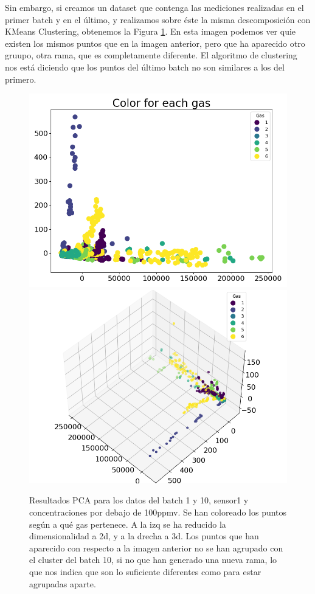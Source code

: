 Sin embargo, si creamos un dataset que contenga las mediciones realizadas en el primer batch y en el último, y realizamos sobre éste la misma descomposición con KMeans Clustering, obtenemos la Figura \ref{fig:step03kmeans-1-10-color-for-each-gas}. En esta imagen podemos ver quie existen los mismos puntos que en la imagen anterior, pero que ha aparecido otro gruupo, otra rama, que es completamente diferente. El algoritmo de clustering nos está diciendo que los puntos del último batch no son similares a los del primero. 

\begin{figure}[h!]
	\centering
	\includegraphics[width=0.45\linewidth]{"../py_imgs/Step0_3_Color for each gas_Batch1and10_Sensor1_Conc less 100ppmv"}
	\includegraphics[width=0.45\linewidth]{"../py_imgs/Step0_3_Color for each gas_3d_Batch1and10_Sensor1_Conc less 100ppmv"}
	\caption[Resultados PCA modelo batch 1 y 10]{Resultados PCA para los datos del batch 1 y 10, sensor1 y concentraciones por debajo de 100ppmv. Se han coloreado los  puntos según a qué gas pertenece. A la izq se ha reducido la dimensionalidad a 2d, y a la drecha a 3d. Los puntos que han aparecido con respecto a la imagen anterior no se han agrupado con el cluster del batch 10, si no que han generado una nueva rama, lo que nos indica que son lo suficiente diferentes como para estar agrupadas aparte.}
	\label{fig:step03kmeans-1-10-color-for-each-gas}
\end{figure}

